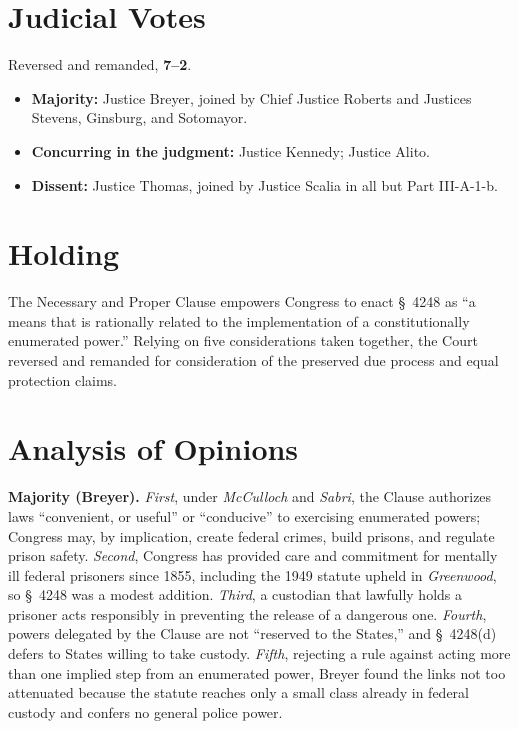 \documentclass[12pt]{article}
\begin{document}
\section{Judicial Votes}

Reversed and remanded, \textbf{7--2}.
\begin{itemize}
\item \textbf{Majority:} Justice Breyer, joined by Chief Justice Roberts and Justices Stevens, Ginsburg, and Sotomayor.
\item \textbf{Concurring in the judgment:} Justice Kennedy; Justice Alito.
\item \textbf{Dissent:} Justice Thomas, joined by Justice Scalia in all but Part III-A-1-b.
\end{itemize}

\section{Holding}

The Necessary and Proper Clause empowers Congress to enact \S~4248 as ``a means that is rationally related to the implementation of a constitutionally enumerated power.'' Relying on five considerations taken together, the Court reversed and remanded for consideration of the preserved due process and equal protection claims.

\section{Analysis of Opinions}

\textbf{Majority (Breyer).} \textit{First}, under \textit{McCulloch} and \textit{Sabri}, the Clause authorizes laws ``convenient, or useful'' or ``conducive'' to exercising enumerated powers; Congress may, by implication, create federal crimes, build prisons, and regulate prison safety. \textit{Second}, Congress has provided care and commitment for mentally ill federal prisoners since 1855, including the 1949 statute upheld in \textit{Greenwood}, so \S~4248 was a modest addition. \textit{Third}, a custodian that lawfully holds a prisoner acts responsibly in preventing the release of a dangerous one. \textit{Fourth}, powers delegated by the Clause are not ``reserved to the States,'' and \S~4248(d) defers to States willing to take custody. \textit{Fifth}, rejecting a rule against acting more than one implied step from an enumerated power, Breyer found the links not too attenuated because the statute reaches only a small class already in federal custody and confers no general police power.
\end{document}
